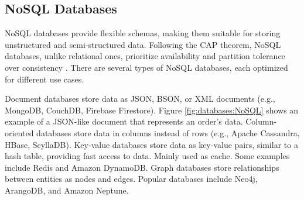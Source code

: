 \subsection{NoSQL Databases}
\gls{NoSQL} databases provide flexible schemas, making them suitable
for storing unstructured and semi-structured data. Following the \gls{CAP} theorem,
\gls{NoSQL} databases, unlike relational ones, prioritize availability and partition
tolerance over consistency \cite{Yadav2024, bdcc7020097}. There are several types of \gls{NoSQL} databases,
each optimized for different use cases.

Document databases store data as \gls{JSON}, \gls{BSON}, or \gls{XML} documents (e.g.,
MongoDB, CouchDB, Firebase Firestore). Figure \ref{fig:databases:NoSQL}
shows an example of a \gls{JSON}-like document that represents an order's data.
Column-oriented databases store data in columns instead of rows (e.g.,
Apache Cassandra, HBase, ScyllaDB).
Key-value databases store data as key-value pairs, similar to
a hash table, providing fast access to data. Mainly used as cache. Some
examples include Redis and Amazon DynamoDB.
Graph databases store relationships between entities as nodes and
edges. Popular databases include Neo4j, ArangoDB, and Amazon Neptune\cite{Yadav2024, bdcc7020097}.

